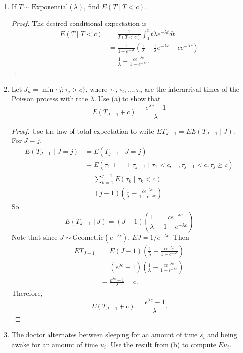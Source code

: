 \documentclass[oneside]{amsart}
\newcommand{\Exp}{\mathrm{Exponential}}
\newcommand{\Geom}{\mathrm{Geometric}}
\theoremstyle{definition}
\begin{document}
\begin{enumerate}[label=(\alph*)]
\item
If $T\sim \Exp(\lambda)$, find $E(T\mid T<c)$.
\begin{proof}
The desired conditional expectation is  
\begin{align*}
	E(T\mid T<c) &= \frac{1}{P(T<c)} \int_0^c t \lambda e^{-\lambda t}dt \\
	&= \frac{1}{1-e^{-\lambda t}}\left( \frac{1}{\lambda} - \frac{1}{\lambda}e^{-\lambda c} - c e^{-\lambda c} \right) \\
	&= \frac{1}{\lambda} - \frac{ce^{-\lambda c}}{1 - e^{-\lambda c}}.
\end{align*}
\end{proof}
\item
Let $J_n= \min\{j:\tau_j > c\}$, where $\tau_1,\tau_2,\dotsc,\tau_n$ are the interarrival times of the Poisson process with rate $\lambda$. Use (a) to show that 
\[
	E(T_{J-1} + c) = \frac{e^{\lambda c} -1}{\lambda} 
\]
\begin{proof}
Use the law of total expectation to write $E T_{J-1} = E E (T_{J-1} \mid J)$. For $J = j$,
\begin{align*}
	E (T_{J-1} \mid J = j) &= E (T_{j-1} \mid J = j) \\
	&= E (\tau_1 + \cdots + \tau_{j-1} \mid \tau_1 < c, \cdots, \tau_{j-1} < c, \tau_j \geq c) \\
	&= \sum_{k=1}^{j-1} E(\tau_k \mid \tau_k < c) \\
	&= (j-1) \left( \frac{1}{\lambda} - \frac{ce^{-\lambda c}}{1 - e^{-\lambda c}} \right)
\end{align*}
So 
\[
	E(T_{J-1} \mid J) = (J-1)  \left( \frac{1}{\lambda} - \frac{ce^{-\lambda c}}{1 - e^{-\lambda c}} \right)
\]
Note that since $J \sim \Geom(e^{-\lambda c})$, $E J = 1/e^{-\lambda c}$. Then 
\begin{align*}
	E T_{J-1} &=  E (J-1)  \left( \frac{1}{\lambda} - \frac{ce^{-\lambda c}}{1 - e^{-\lambda c}} \right) \\
	&= (e^{\lambda c} -1) \left( \frac{1}{\lambda} - \frac{ce^{-\lambda c}}{1 - e^{-\lambda c}} \right) \\
	&= \frac{e^{\lambda c} -1}{\lambda} - c.
\end{align*}
Therefore,  
\[
	E(T_{J-1} + c) = \frac{e^{\lambda c} -1}{\lambda}.
\]
\end{proof}
\item
The doctor alternates between sleeping for an amount of time $s_i$ and being awake for an amount of time $u_i$. Use the result from (b) to compute $E u_i$.

\end{enumerate}
\end{document}
